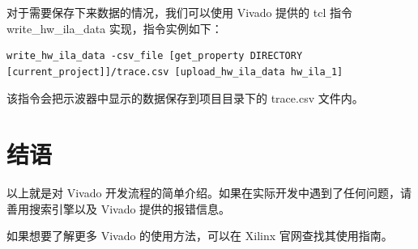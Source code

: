 \documentclass[ichigo,normal,cn]{elegantnote_mod}
\begin{document}
对于需要保存下来数据的情况，我们可以使用 
Vivado 提供的
 tcl 指令 write\_hw\_ila\_data 实现，指令实例如下： 

\begin{lstlisting}
write_hw_ila_data -csv_file [get_property DIRECTORY [current_project]]/trace.csv [upload_hw_ila_data hw_ila_1]  
\end{lstlisting}

该指令会把示波器中显示的数据保存到项目目录下的 trace.csv 文件内。

\section{结语}
以上就是对 Vivado 开发流程的简单介绍。如果在实际开发中遇到了任何问题，请
善用搜索引擎以及 Vivado 提供的报错信息。

如果想要了解更多 Vivado 的使用方法，可以在 Xilinx 官网查找其使用指南。
\end{document}
